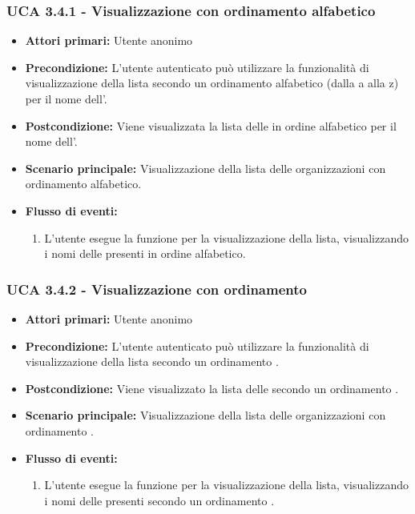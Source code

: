 \subsubsection{UCA 3.4.1 - Visualizzazione con ordinamento alfabetico}%
\begin{itemize}
	\item \textbf{Attori primari:} Utente anonimo
	\item \textbf{Precondizione:} L'utente autenticato può utilizzare la funzionalità di visualizzazione della lista secondo un ordinamento alfabetico (dalla a alla z) per il nome dell'.
	\item \textbf{Postcondizione:} Viene visualizzata la lista delle  in ordine alfabetico per il nome dell'.
	\item \textbf{Scenario principale:} Visualizzazione della lista delle organizzazioni con ordinamento alfabetico.
	\item \textbf{Flusso di eventi:}
	\begin{enumerate}
		\item L'utente esegue la funzione per la visualizzazione della lista, visualizzando i nomi delle  presenti in ordine alfabetico.
	\end{enumerate}
\end{itemize}

\subsubsection{UCA 3.4.2 - Visualizzazione con ordinamento }%
\begin{itemize}	
	\item \textbf{Attori primari:} Utente anonimo
	\item \textbf{Precondizione:} L'utente autenticato può utilizzare la funzionalità di visualizzazione della lista secondo un ordinamento .
	\item \textbf{Postcondizione:} Viene visualizzato la lista delle  secondo un ordinamento .
	\item \textbf{Scenario principale:} Visualizzazione della lista delle organizzazioni con ordinamento .
	\item \textbf{Flusso di eventi:}
		\begin{enumerate}
		\item L'utente esegue la funzione per la visualizzazione della lista, visualizzando i nomi delle  presenti secondo un ordinamento .
	\end{enumerate}
\end{itemize}


